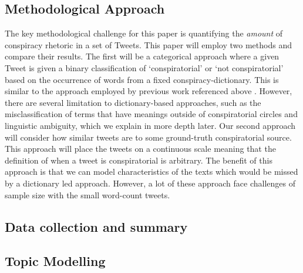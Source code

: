\documentclass[11pt]{article}
\begin{document}
\subsection{Methodological Approach} \label{Subsection: Methodological Approach}

The key methodological challenge for this paper is quantifying the \textit{amount} of conspiracy rhetoric in a set of Tweets. This paper will employ two methods and compare their results. The first will be a categorical approach where a given Tweet is given a binary classification of `conspiratorial' or `not conspiratorial' based on the occurrence of words from a fixed conspiracy-dictionary. This is similar to the approach employed by previous work referenced above \citep{jackson2021qanon, ahmed2020covid}. However, there are several limitation to dictionary-based approaches, such as the misclassification of terms that have meanings outside of conspiratorial circles and linguistic ambiguity, which we explain in more depth later. Our second approach will consider how similar tweets are to some ground-truth conspiratorial source. This approach will place the tweets on a continuous scale meaning that the definition of when a tweet is conspiratorial is arbitrary. The benefit of this approach is that we can model characteristics of the texts which would be missed by a dictionary led approach. However, a lot of these approach face challenges of sample size with the small word-count tweets.

\subsection{Data collection and summary} \label{Subsection: Data collection and summary}
\subsection{Topic Modelling} \label{Subsection: Topic Modelling}
\end{document}
